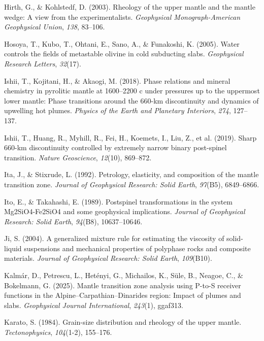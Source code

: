 \documentclass[draft,linenumbers]{agujournal2019}
\newlength{\cslhangindent}
\newenvironment{CSLReferences}[2]
 {\begin{list}{}{
  \setlength{\itemindent}{0pt}
  \setlength{\leftmargin}{0pt}
  \setlength{\parsep}{0pt}
  \ifodd #1
   \setlength{\leftmargin}{\cslhangindent}
   \setlength{\itemindent}{-\cslhangindent}
  \fi
  \setlength{\itemsep}{#2\baselineskip}
  }
  \item\relax}
 {\end{list}}
\begin{document}
\begin{CSLReferences}{1}{0}
Hirth, G., \& Kohlstedf, D. (2003). Rheology of the upper mantle and the
mantle wedge: A view from the experimentalists. \emph{Geophysical
Monograph-American Geophysical Union}, \emph{138}, 83--106.

Hosoya, T., Kubo, T., Ohtani, E., Sano, A., \& Funakoshi, K. (2005).
Water controls the fields of metastable olivine in cold subducting
slabs. \emph{Geophysical Research Letters}, \emph{32}(17).

Ishii, T., Kojitani, H., \& Akaogi, M. (2018). Phase relations and
mineral chemistry in pyrolitic mantle at 1600--2200 c under pressures up
to the uppermost lower mantle: Phase transitions around the 660-km
discontinuity and dynamics of upwelling hot plumes. \emph{Physics of the
Earth and Planetary Interiors}, \emph{274}, 127--137.

{Ishii, T., Huang, R., Myhill, R., Fei, H., Koemets, I., Liu, Z., et
al.} (2019). Sharp 660-km discontinuity controlled by extremely narrow
binary post-spinel transition. \emph{Nature Geoscience}, \emph{12}(10),
869--872.

Ita, J., \& Stixrude, L. (1992). Petrology, elasticity, and composition
of the mantle transition zone. \emph{Journal of Geophysical Research:
Solid Earth}, \emph{97}(B5), 6849--6866.

Ito, E., \& Takahashi, E. (1989). Postspinel transformations in the
system Mg2SiO4-Fe2SiO4 and some geophysical implications. \emph{Journal
of Geophysical Research: Solid Earth}, \emph{94}(B8), 10637--10646.

Ji, S. (2004). A generalized mixture rule for estimating the viscosity
of solid-liquid suspensions and mechanical properties of polyphase rocks
and composite materials. \emph{Journal of Geophysical Research: Solid
Earth}, \emph{109}(B10).

Kalmár, D., Petrescu, L., Hetényi, G., Michailos, K., Süle, B., Neagoe,
C., \& Bokelmann, G. (2025). Mantle transition zone analysis using
{P-to-S} receiver functions in the {Alpine--Carpathian--Dinarides}
region: Impact of plumes and slabs. \emph{Geophysical Journal
International}, \emph{243}(1), ggaf313.

Karato, S. (1984). Grain-size distribution and rheology of the upper
mantle. \emph{Tectonophysics}, \emph{104}(1-2), 155--176.


\end{CSLReferences}
\end{document}
